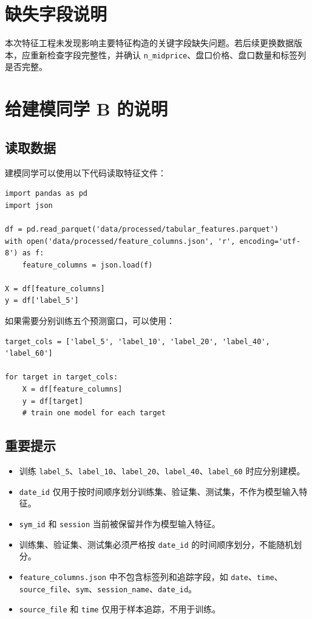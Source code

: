 \documentclass[UTF8,a4paper,12pt]{ctexart}
\begin{document}
\section{缺失字段说明}

本次特征工程未发现影响主要特征构造的关键字段缺失问题。若后续更换数据版本，应重新检查字段完整性，并确认 \texttt{n\_midprice}、盘口价格、盘口数量和标签列是否完整。

\section{给建模同学 B 的说明}

\subsection{读取数据}

建模同学可以使用以下代码读取特征文件：

\begin{lstlisting}
import pandas as pd
import json

df = pd.read_parquet('data/processed/tabular_features.parquet')
with open('data/processed/feature_columns.json', 'r', encoding='utf-8') as f:
    feature_columns = json.load(f)

X = df[feature_columns]
y = df['label_5']
\end{lstlisting}

如果需要分别训练五个预测窗口，可以使用：

\begin{lstlisting}
target_cols = ['label_5', 'label_10', 'label_20', 'label_40', 'label_60']

for target in target_cols:
    X = df[feature_columns]
    y = df[target]
    # train one model for each target
\end{lstlisting}

\subsection{重要提示}

\begin{itemize}
  \item 训练 \texttt{label\_5}、\texttt{label\_10}、\texttt{label\_20}、\texttt{label\_40}、\texttt{label\_60} 时应分别建模。
  \item \texttt{date\_id} 仅用于按时间顺序划分训练集、验证集、测试集，不作为模型输入特征。
  \item \texttt{sym\_id} 和 \texttt{session} 当前被保留并作为模型输入特征。
  \item 训练集、验证集、测试集必须严格按 \texttt{date\_id} 的时间顺序划分，不能随机划分。
  \item \texttt{feature\_columns.json} 中不包含标签列和追踪字段，如 \texttt{date}、\texttt{time}、\texttt{source\_file}、\texttt{sym}、\texttt{session\_name}、\texttt{date\_id}。
  \item \texttt{source\_file} 和 \texttt{time} 仅用于样本追踪，不用于训练。
\end{itemize}
\end{document}
